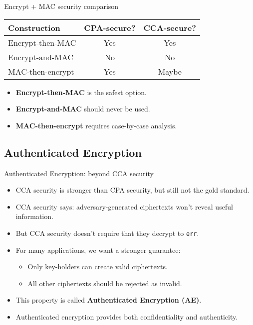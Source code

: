 \documentclass[aspectratio=169, lualatex, handout]{beamer}
\begin{document}
\begin{frame}{Encrypt + MAC security comparison}
	\begin{center}
		\begin{tabular}{|l|c|c|}
			\hline
			\textbf{Construction} & \textbf{CPA-secure?} & \textbf{CCA-secure?} \\
			\hline
			Encrypt-then-MAC      & Yes                  & Yes                  \\
			\hline
			Encrypt-and-MAC       & No                   & No                   \\
			\hline
			MAC-then-encrypt      & Yes                  & Maybe                \\
			\hline
		\end{tabular}
	\end{center}
	\vspace{1em}
	\begin{itemize}[<+->]
		\item \textbf{Encrypt-then-MAC} is the safest option.
		\item \textbf{Encrypt-and-MAC} should never be used.
		\item \textbf{MAC-then-encrypt} requires case-by-case analysis.
	\end{itemize}
\end{frame}

\subsection{Authenticated Encryption}

\begin{frame}{Authenticated Encryption: beyond CCA security}
	\begin{itemize}[<+->]
		\item CCA security is stronger than CPA security, but still not the gold standard.
		\item CCA security says: adversary-generated ciphertexts won't reveal useful information.
		\item But CCA security doesn't require that they decrypt to \texttt{err}.
		\item For many applications, we want a stronger guarantee:
		      \begin{itemize}
			      \item Only key-holders can create valid ciphertexts.
			      \item All other ciphertexts should be rejected as invalid.
		      \end{itemize}
		\item This property is called \textbf{Authenticated Encryption (AE)}.
		\item Authenticated encryption provides both confidentiality and authenticity.
	\end{itemize}
\end{frame}
\end{document}
